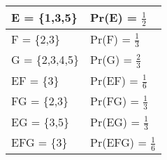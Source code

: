 \begin{tabular}{|l|l|}\hline
E = \{1,3,5\}	&Pr(E) = $\frac{1}{2}$\\\hline
F = \{2,3\}	&Pr(F) = $\frac{1}{3}$\\\hline
G = \{2,3,4,5\}	&Pr(G) = $\frac{2}{3}$\\\hline
EF = \{3\}	&Pr(EF) = $\frac{1}{6}$\\\hline
FG = \{2,3\}	&Pr(FG) = $\frac{1}{3}$\\\hline
EG = \{3,5\}	&Pr(EG) = $\frac{1}{3}$\\\hline
EFG = \{3\}	&Pr(EFG) = $\frac{1}{6}$\\\hline
\end{tabular}
